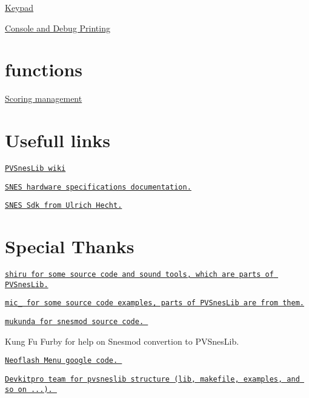 \begin{DoxyItemize}
\item \hyperlink{a00335}{Keypad}
\item \hyperlink{a00320}{Console and Debug Printing}
\end{DoxyItemize}\hypertarget{index_Miscellaneous}{}\section{functions}\label{index_Miscellaneous}

\begin{DoxyItemize}
\item \hyperlink{a00341}{Scoring management}
\end{DoxyItemize}\hypertarget{index_external_links}{}\section{Usefull links}\label{index_external_links}

\begin{DoxyItemize}
\item \href{http://www.portabledev.com/wiki/doku.php}{\tt P\+V\+Snes\+Lib wiki}
\item \href{http://nocash.emubase.de/sns.htm}{\tt S\+N\+ES hardware specifications documentation.}
\item \href{http://code.google.com/p/snes-sdk/}{\tt S\+N\+ES Sdk from Ulrich Hecht.}
\end{DoxyItemize}\hypertarget{index_special_thanks}{}\section{Special Thanks}\label{index_special_thanks}

\begin{DoxyItemize}
\item \href{http://shiru.untergrund.net/}{\tt shiru for some source code and sound tools, which are parts of P\+V\+Snes\+Lib.}
\item \href{http://jiggawatt.org/badc0de/index.html}{\tt mic\+\_\+ for some source code examples, parts of P\+V\+Snes\+Lib are from them.}
\item \href{http://snes.mukunda.com/}{\tt mukunda for snesmod source code. }
\item Kung Fu Furby for help on Snesmod convertion to P\+V\+Snes\+Lib.
\item \href{http://code.google.com/p/neo-myth-menu/}{\tt Neoflash Menu google code. }
\item \href{http://www.devkitpro.org/}{\tt Devkitpro team for pvsneslib structure (lib, makefile, examples, and so on ...). } 
\end{DoxyItemize}
